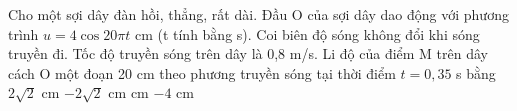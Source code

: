\begin{vidu}%
Cho một sợi dây đàn hồi, thẳng, rất dài. Đầu O của sợi dây dao động với phương trình $u = 4\cos20\pi t$ cm (t tính bằng s). Coi biên độ sóng không đổi khi sóng truyền đi. Tốc độ truyền sóng trên dây là 0,8 m/s. Li độ của điểm M trên dây cách O một đoạn 20 cm theo phương truyền sóng tại thời điểm $t = 0,35$ s bằng
\choice
{$2\sqrt{2}$ cm}
{$-2\sqrt{2}$ cm}
{ cm}
{$-4$ cm}
\end{vidu} 


